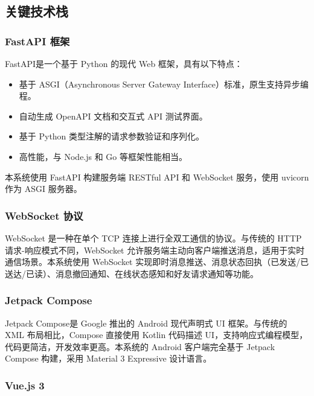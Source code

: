 \subsection{关键技术栈}\label{sec:techstack}

\subsubsection{FastAPI 框架}

FastAPI\supercite{fastapi}是一个基于 Python 的现代 Web 框架，具有以下特点：

\begin{itemize}
    \item 基于 ASGI（Asynchronous Server Gateway Interface）标准，原生支持异步编程。
    \item 自动生成 OpenAPI 文档和交互式 API 测试界面。
    \item 基于 Python 类型注解的请求参数验证和序列化。
    \item 高性能，与 Node.js 和 Go 等框架性能相当。
\end{itemize}

本系统使用 FastAPI 构建服务端 RESTful API 和 WebSocket 服务，使用 uvicorn 作为 ASGI 服务器。

\subsubsection{WebSocket 协议}

WebSocket 是一种在单个 TCP 连接上进行全双工通信的协议\supercite{fette2011websocket}。与传统的 HTTP 请求-响应模式不同，WebSocket 允许服务端主动向客户端推送消息，适用于实时通信场景。本系统使用 WebSocket 实现即时消息推送、消息状态回执（已发送/已送达/已读）、消息撤回通知、在线状态感知和好友请求通知等功能。

\subsubsection{Jetpack Compose}

Jetpack Compose\supercite{jetpackcompose}是 Google 推出的 Android 现代声明式 UI 框架。与传统的 XML 布局相比，Compose 直接使用 Kotlin 代码描述 UI，支持响应式编程模型，代码更简洁，开发效率更高。本系统的 Android 客户端完全基于 Jetpack Compose 构建，采用 Material 3 Expressive 设计语言。

\subsubsection{Vue.js 3}

